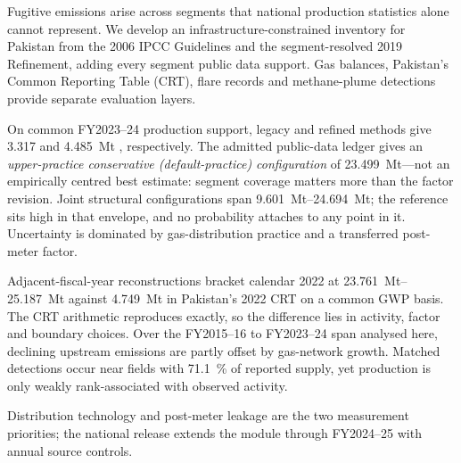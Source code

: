Fugitive emissions arise across segments that national production statistics
alone cannot represent. We develop an infrastructure-constrained inventory for Pakistan from
the 2006 IPCC Guidelines and the segment-resolved 2019 Refinement, adding every segment
public data support. Gas balances, Pakistan's Common Reporting Table
(CRT), flare records and methane-plume detections provide separate evaluation layers.

On common FY2023--24 production support, legacy and refined methods give
\SI{3.317}{} and \SI{4.485}{\mega\tonne} \COe{}, respectively. The admitted public-data
ledger gives an \emph{upper-practice conservative (default-practice) configuration} of
\SI{23.499}{\mega\tonne}---not an empirically centred best estimate: segment
coverage matters more than the factor revision. Joint structural configurations
span \SIrange{9.601}{24.694}{\mega\tonne}; the reference sits high in that
envelope, and no probability attaches to any point in it. Uncertainty is dominated by
gas-distribution practice and a transferred post-meter factor.

Adjacent-fiscal-year reconstructions bracket calendar 2022 at
\SIrange{23.761}{25.187}{\mega\tonne} against
\SI{4.749}{\mega\tonne} in Pakistan's 2022 CRT on a common GWP basis. The CRT arithmetic
reproduces exactly, so the difference lies in activity, factor and boundary choices. Over the
FY2015--16 to FY2023--24 span analysed here, declining upstream emissions are partly offset by
gas-network growth. Matched detections occur near fields with \SI{71.1}{\percent} of reported supply,
yet production is only weakly rank-associated with observed activity.

Distribution technology and post-meter leakage are the two measurement priorities; the
national release extends the module through FY2024--25 with annual source controls.
